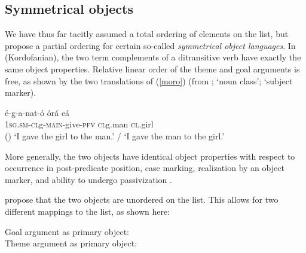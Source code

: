 \documentclass[output=paper,biblatex,babelshorthands,newtxmath,draftmode,colorlinks, citecolor=brown]{langscibook}
\begin{document}
\subsection{Symmetrical objects}

\largerpage[2]
We have thus far tacitly assumed a total ordering of elements on the \argst list, but
\citet*{AMM2013a,Ackermanetal2017} propose a partial ordering for certain so-called
\emph{symmetrical object languages}.  In  (Kordofanian), the two term complements of a
ditransitive verb have exactly the same object properties.  Relative linear order
of the theme and goal arguments is free, as shown by the two translations of (\ref{moro}) (from
\citealt[9]{Ackermanetal2017};  `noun class';  `subject marker).


\begin{exe}
	\ex\label{moro}
\gll   \'{e}-g-a-nat-\'{o} \'{o}r\'{a}  e\'{a}  \\
        1\textsc{sg.sm-cl}g-\textsc{main}-give-\textsc{pfv}    \textsc{cl}g.man \textsc{cl}.girl \\\hfill()
\glt `I gave the girl to the man.’ / `I gave the man to the girl.’
\end{exe} 

\noindent
More generally, the two objects have identical object properties with respect to occurrence in
post-predicate position, case marking, realization by an object marker, and ability to undergo
passivization \citep[9]{Ackermanetal2017}.

\citet{Ackermanetal2017} propose that the two objects are unordered on the \argst list.  This allows
for two different mappings to the \comps list, as shown here:

\begin{exe} 
\ex		\label{moro-avm1}
\begin{xlist}
\ex Goal argument as primary object: \\
\ex Theme argument as primary object: \\
\end{xlist}
\end{exe}
\end{document}
